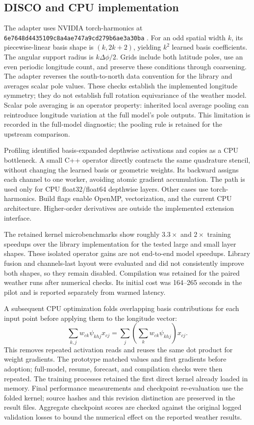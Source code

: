 \documentclass[10pt]{article}
\begin{document}
\subsection{DISCO and CPU implementation}
The adapter uses NVIDIA torch-harmonics at
\texttt{6e7648d4435109c8a4ae747a9cd279b6ae3a30ba} \cite{harmonics,disco}.
For an odd spatial width $k$, its piecewise-linear basis shape is $(k,2k+2)$,
yielding $k^2$ learned basis coefficients. The angular support radius is
$k\Delta\phi/2$. Grids include both latitude poles, use an even periodic longitude
count, and preserve these conditions through coarsening. The adapter reverses the
south-to-north data convention for the library and averages scalar pole values.
These checks establish the implemented longitude symmetry; they do not establish
full rotation equivariance of the weather model. Scalar pole averaging is an
operator property: inherited local average pooling can reintroduce longitude
variation at the full model's pole outputs. This limitation is recorded in the
full-model diagnostic; the pooling rule is retained for the upstream comparison.

Profiling identified basis-expanded depthwise activations and copies as a CPU
bottleneck. A small C++ operator directly contracts the same quadrature stencil,
without changing the learned basis or geometric weights. Its backward assigns each
channel to one worker, avoiding atomic gradient accumulation. The path is used only
for CPU float32/float64 depthwise layers. Other cases use torch-harmonics. Build
flags enable OpenMP, vectorization, and the current CPU architecture. Higher-order
derivatives are outside the implemented extension interface.

The retained kernel microbenchmarks show roughly $3.3\times$ and $2\times$ training
speedups over the library implementation for the tested large and small layer
shapes. These isolated operator gains are not end-to-end model speedups. Library
fusion and channels-last layout were evaluated and did not consistently improve both
shapes, so they remain disabled. Compilation was retained for the paired weather
runs after numerical checks. Its initial cost was 164--265 seconds in the pilot and
is reported separately from warmed latency.

A subsequent CPU optimization folds overlapping basis contributions for each
input point before applying them to the longitude vector:
\[
 \sum_{k,j} w_{ck}\psi_{khj}x_{cj}
 =\sum_j\left(\sum_k w_{ck}\psi_{khj}\right)x_{cj}.
\]
This removes repeated activation reads and reuses the same dot product for weight
gradients. The prototype matched values and first gradients before adoption;
full-model, resume, forecast, and compilation checks were then repeated. The
training processes retained the first direct kernel already loaded in memory.
Final performance measurements and checkpoint re-evaluation use the folded kernel;
source hashes and this revision distinction are preserved in the result files.
Aggregate checkpoint scores are checked against the original logged validation
losses to bound the numerical effect on the reported weather results.
\end{document}
